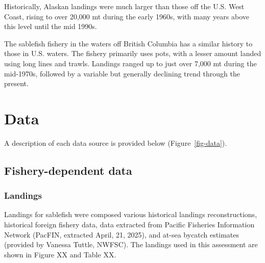 \documentclass[
]{scrartcl}
\begin{document}
Historically, Alaskan landings were much larger than those off the U.S.
West Coast, rising to over 20,000 mt during the early 1960s, with many
years above this level until the mid 1990s.

The sablefish fishery in the waters off British Columbia has a similar
history to those in U.S. waters. The fishery primarily uses pots, with a
lesser amount landed using long lines and trawls. Landings ranged up to
just over 7,000 mt during the mid-1970s, followed by a variable but
generally declining trend through the present.

\newpage{}

\section{Data}\label{data}

A description of each data source is provided below
(Figure~\ref{fig-data}).

\subsection{Fishery-dependent data}\label{fishery-dependent-data}

\subsubsection{Landings}\label{landings}

Landings for sablefish were composed various historical landings
reconstructions, historical foreign fishery data, data extracted from
Pacific Fisheries Information Network (PacFIN, extracted April, 21,
2025), and at-sea bycatch estimates (provided by Vanessa Tuttle, NWFSC).
The landings used in this assessment are shown in Figure XX and Table
XX.
\end{document}
